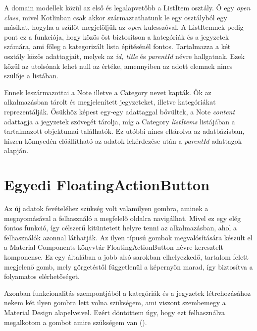 A domain modellek közül az első és legalapvetőbb a ListItem osztály. Ő egy \emph{open class}, mivel Kotlinban csak akkor származtathatunk le egy osztályból egy másikat, hogyha a szülőt megjelöljük az \emph{open} kulcsszóval. A ListItemnek pedig pont ez a funkciója, hogy közös őst biztosítson a kategóriák és a jegyzetek számára, ami főleg a kategorizált lista építésénél fontos. Tartalmazza a két osztály közös adattagjait, melyek az \emph{id, title} és \emph{parentId} névre hallgatnak. Ezek közül az utolsónak lehet null az értéke, amennyiben az adott elemnek nincs szülője a listában.

Ennek leszármazottai a Note illetve a Category nevet kapták. Ők az alkalmazásban tárolt és megjelenített jegyzeteket, illetve kategóriákat reprezentálják. Ősükhöz képest egy-egy adattaggal bővültek, a Note \emph{content} adattagja a jegyzetek szövegét tárolja, míg a Category \emph{listItems} listájában a tartalmazott objektumai találhatók. Ez utóbbi nincs eltárolva az adatbázisban, hiszen könnyedén előállítható az adatok lekérdezése után a \emph{parentId} adattagok alapján.

\section{Egyedi FloatingActionButton}
Az új adatok fevételéhez szükség volt valamilyen gombra, aminek a megnyomásával a felhasználó a megfelelő oldalra navigálhat. Mivel ez egy elég fontos funkció, így célszerű kitüntetett helyre tenni az alkalmazásban, ahol a felhasználók azonnal láthatják. Az ilyen típusú gombok megvalósítására készült el a Material Components könyvtár FloatingActionButton névre keresztelt komponense. Ez egy általában a jobb alsó sarokban elhelyezkedő, tartalom felett megjelenő gomb, mely görgetéstől függetlenül a képernyőn marad, így biztosítva a folyamatos elérhetőséget.

Azonban funkcionalitás szempontjából a kategóriák és a jegyzetek létrehozásához nekem két ilyen gombra lett volna szükségem, ami viszont szembemegy a Material Design alapelveivel. Ezért döntöttem úgy, hogy ezt felhasználva megalkotom a gombot amire szükségem van ().

